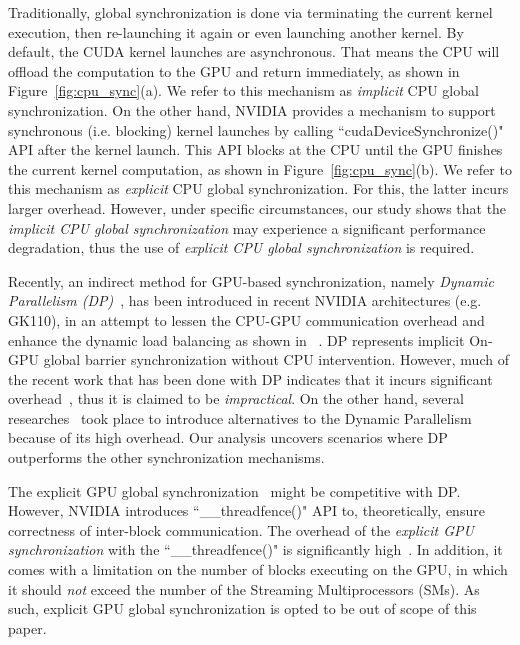 \documentclass[conference]{IEEEtran}
\begin{document}
Traditionally, global synchronization is done via terminating the current kernel execution, then re-launching it again or even launching another kernel. By default, the CUDA kernel launches are asynchronous. That means the CPU will offload the computation to the GPU and return immediately, as shown in Figure~\ref{fig:cpu_sync}(a). We refer to this mechanism as \emph{implicit} CPU global synchronization. On the other hand, NVIDIA provides a mechanism to support synchronous (i.e. blocking) kernel launches by calling ``cudaDeviceSynchronize()" API after the kernel launch. This API blocks at the CPU until the GPU finishes the current kernel computation, as shown in Figure~\ref{fig:cpu_sync}(b). We refer to this mechanism as \emph{explicit} CPU global synchronization. For this, the latter incurs larger overhead. However, under specific circumstances, our study shows that the \emph{implicit CPU global synchronization} may experience a significant performance degradation, thus the use of \emph{explicit CPU global synchronization} is required.

Recently, an indirect method for GPU-based synchronization, namely \emph{Dynamic Parallelism (DP)}~\cite{proc5,proc5_}, has been introduced in recent NVIDIA architectures (e.g. GK110), in an attempt to lessen the CPU-GPU communication overhead and enhance the dynamic load balancing as shown in ~\cite{proc1,proc2,proc3,proc6}. DP represents implicit On-GPU global barrier synchronization without CPU intervention. However, much of the recent work that has been done with DP indicates that it incurs significant overhead~\cite{proc1,proc3,proc4,proc7,proc8}, thus it is claimed to be \emph{impractical}. On the other hand, several researches~\cite{free_launch, DTBL} took place to introduce alternatives to the Dynamic Parallelism because of its high overhead. Our analysis uncovers scenarios where DP outperforms the other synchronization mechanisms. 

The explicit GPU global synchronization~\cite{proc9} might be competitive with DP. However, NVIDIA introduces ``\_\_threadfence()" API to, theoretically, ensure correctness of inter-block communication. The overhead of the \emph{explicit GPU synchronization} with the ``\_\_threadfence()" is significantly high~\cite{proc12}. In addition, it comes with a limitation on the number of blocks executing on the GPU, in which it should \emph{not} exceed the number of the Streaming Multiprocessors (SMs). As such, explicit GPU global synchronization is opted to be out of scope of this paper.
\end{document}

